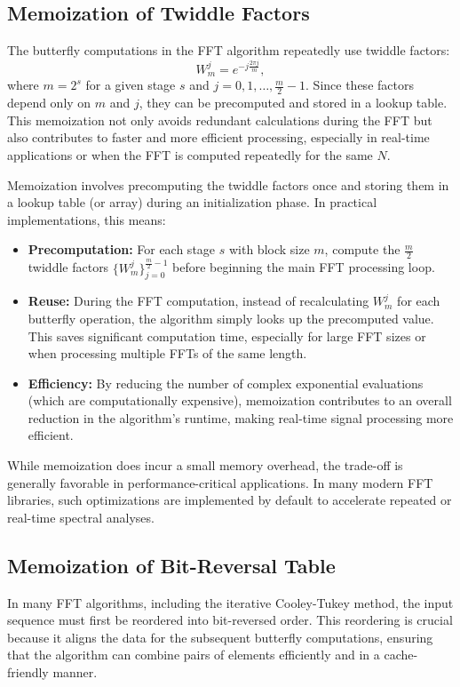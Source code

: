 \documentclass[12pt,letter]{article}
\begin{document}
\subsection{Memoization of Twiddle Factors}

The butterfly computations in the FFT algorithm repeatedly use twiddle
factors:
$$
W_m^j = e^{-j\frac{2\pi j}{m}},
$$
where \( m = 2^s \) for a given stage \( s \) and \( j = 0, 1, \ldots, \frac{m}{2}-1 \). Since these factors depend only on \( m \) and \( j \), they can be precomputed and stored in a lookup table. This memoization not only avoids redundant calculations during the FFT but also contributes to faster and more efficient processing, especially in real-time applications or when the FFT is computed repeatedly for the same \( N \).

Memoization involves precomputing the twiddle factors once and storing them
in a lookup table (or array) during an initialization phase. In practical
implementations, this means:
\begin{itemize}
  \item \textbf{Precomputation:} For each stage $s$ with block size
  $m$, compute the $\frac{m}{2}$ twiddle factors
  $\{W_m^j\}_{j=0}^{\frac{m}{2}-1}$ before beginning the main FFT
  processing loop.
  \item \textbf{Reuse:} During the FFT computation, instead of recalculating
  $W_m^j$ for each butterfly operation, the algorithm simply looks up the
  precomputed value. This saves significant computation time, especially for
  large FFT sizes or when processing multiple FFTs of the same length.
  \item \textbf{Efficiency:} By reducing the number of complex exponential
  evaluations (which are computationally expensive), memoization contributes
  to an overall reduction in the algorithm's runtime, making real-time signal
  processing more efficient.
\end{itemize}

While memoization does incur a small memory overhead, the trade-off is
generally favorable in performance-critical applications. In many modern FFT
libraries, such optimizations are implemented by default to accelerate
repeated or real-time spectral analyses.

\subsection{Memoization of Bit-Reversal Table}

In many FFT algorithms, including the iterative Cooley-Tukey method, the input
sequence must first be reordered into bit-reversed order. This reordering is
crucial because it aligns the data for the subsequent butterfly computations,
ensuring that the algorithm can combine pairs of elements efficiently and in a
cache-friendly manner.
\end{document}
